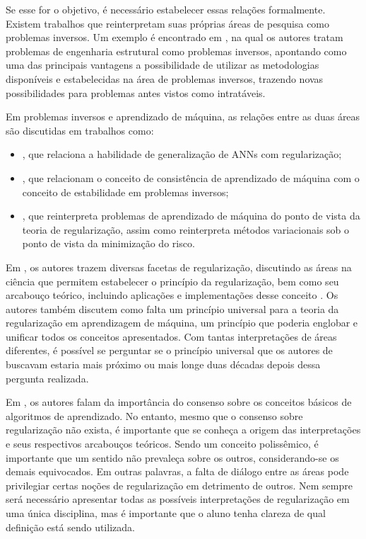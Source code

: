 Se esse for o objetivo, é necessário estabelecer essas relações formalmente. Existem trabalhos que reinterpretam suas próprias áreas de pesquisa como problemas inversos. Um exemplo é encontrado em \cite{Gallet2022}, na qual os autores tratam problemas de engenharia estrutural como problemas inversos, apontando como uma das principais vantagens a possibilidade de utilizar as metodologias disponíveis e estabelecidas na área de problemas inversos, trazendo novas possibilidades para problemas antes vistos como intratáveis.

Em problemas inversos e aprendizado de máquina, as relações entre as duas áreas são discutidas em trabalhos como:
\begin{itemize}
\item  \cite{Krkov2005}, que relaciona a habilidade de generalização de ANNs com regularização; 
\item \cite{Mukherjee2006, devito2005}, que relacionam o conceito de consistência de aprendizado de máquina com o conceito de estabilidade em problemas inversos; 
\item \cite{Burger2021}, que reinterpreta problemas de aprendizado de máquina do ponto de vista da teoria de regularização, assim como reinterpreta métodos variacionais sob o ponto de vista da minimização do risco.
\end{itemize}

Em \cite{Chen2002}, os autores trazem diversas facetas de regularização, discutindo as áreas na ciência que permitem estabelecer o princípio da regularização, bem como seu arcabouço teórico, incluindo aplicações e implementações desse conceito \cite[Figura 2]{Chen2002}. Os autores também discutem como falta um princípio universal para a teoria da regularização em aprendizagem de máquina, um princípio que poderia englobar e unificar todos os conceitos apresentados. Com tantas interpretações de áreas diferentes, é possível se perguntar se o princípio universal que os autores de \cite{Chen2002} buscavam estaria mais próximo ou mais longe duas décadas depois dessa pergunta realizada. 

Em \cite[pág. 969]{Cherkassky2009}, os autores falam da importância do consenso sobre os conceitos básicos de algoritmos de aprendizado. No entanto, mesmo que o consenso sobre regularização não exista, é importante que se conheça a origem das interpretações e seus respectivos arcabouços teóricos. 
 Sendo um conceito polissêmico, é importante que um sentido não prevaleça sobre os outros, considerando-se os demais equivocados. Em outras palavras, a falta de diálogo entre as áreas pode privilegiar certas noções de regularização em detrimento de outros. Nem sempre será necessário apresentar todas as possíveis interpretações de regularização em uma única disciplina, mas é importante que o aluno tenha clareza de qual definição está sendo utilizada. 


